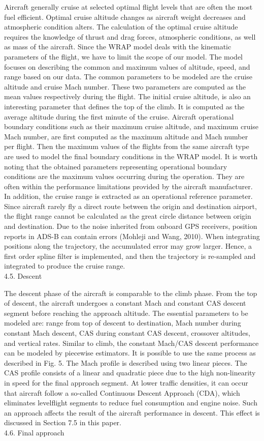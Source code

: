 \documentclass[a4paper,punct,space,heading=true,AutoFakeBold]{ctexrep}
\begin{document}
Aircraft generally cruise at selected optimal flight levels that are often the most fuel efficient. Optimal cruise altitude changes as aircraft weight decreases and atmospheric condition alters. The calculation of the optimal cruise altitude requires the knowledge of thrust and drag forces, atmospheric conditions, as well as mass of the aircraft. Since the WRAP model deals with the kinematic parameters of the flight, we have to limit the scope of our model. The model focuses on describing the common and maximum values of altitude, speed, and range based on our data.
The common parameters to be modeled are the cruise altitude and cruise Mach number. These two parameters are computed as the mean values respectively during the flight. The initial cruise altitude, is also an interesting parameter that defines the top of the climb. It is computed as the average altitude during the first minute of the cruise.
Aircraft operational boundary conditions such as their maximum cruise altitude, and maximum cruise Mach number, are first computed as the maximum altitude and Mach number per flight. Then the maximum values of the flights from the same aircraft type are used to model the final boundary conditions in the WRAP model. It is worth noting that the obtained parameters representing operational boundary conditions are the maximum values occurring during the operation. They are often within the performance limitations provided by the aircraft manufacturer.
In addition, the cruise range is extracted as an operational reference parameter. Since aircraft rarely fly a direct route between the origin and destination airport, the flight range cannot be calculated as the great circle distance between origin and destination. Due to the noise inherited from onboard GPS receivers, position reports in ADS-B can contain errors (Mohleji and Wang, 2010). When integrating positions along the trajectory, the accumulated error may grow larger. Hence, a first order spline filter is implemented, and then the trajectory is re-sampled and integrated to produce the cruise range.\\
4.5. Descent

The descent phase of the aircraft is comparable to the climb phase. From the top of descent, the aircraft undergoes a constant Mach and constant CAS descent segment before reaching the approach altitude.
The essential parameters to be modeled are: range from top of descent to destination, Mach number during constant Mach descent, CAS during constant CAS descent, crossover altitudes, and vertical rates.
Similar to climb, the constant Mach/CAS descent performance can be modeled by piecewise estimators. It is possible to use the same process as described in Fig. 5. The Mach profile is described using two linear pieces. The CAS profile consists of a linear and quadratic piece due to the high non-linearity in speed for the final approach segment.
At lower traffic densities, it can occur that aircraft follow a so-called Continuous Descent Approach (CDA), which eliminates levelflight segments to reduce fuel consumption and engine noise. Such an approach affects the result of the aircraft performance in descent. This effect is discussed in Section 7.5 in this paper.\\
4.6. Final approach
\end{document}
